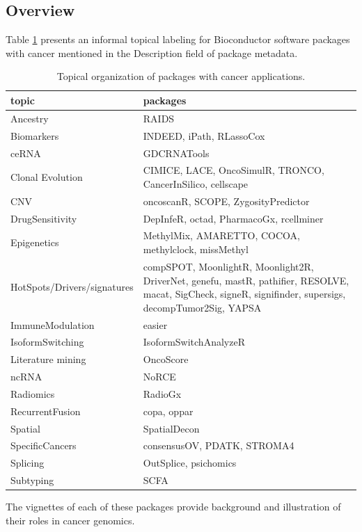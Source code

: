 \hypertarget{overview}{%
\subsection{Overview}\label{overview}}

Table \ref{tab:tab-wflow} presents an informal topical
labeling for Bioconductor software packages with
cancer mentioned in the Description field of package
metadata.

\begin{longtable}[t]{l>{\raggedright\arraybackslash}p{30em}}
\caption{\label{tab:tab-wflow}Topical organization of packages with cancer applications.}\\
\toprule
topic & packages\\
\midrule
Ancestry & RAIDS\\
Biomarkers & INDEED, iPath, RLassoCox\\
ceRNA & GDCRNATools\\
Clonal Evolution & CIMICE, LACE, OncoSimulR, TRONCO, CancerInSilico, cellscape\\
CNV & oncoscanR, SCOPE, ZygosityPredictor\\
\addlinespace
DrugSensitivity & DepInfeR, octad, PharmacoGx, rcellminer\\
Epigenetics & MethylMix, AMARETTO, COCOA, methylclock, missMethyl\\
HotSpots/Drivers/signatures & compSPOT, MoonlightR, Moonlight2R, DriverNet, genefu, mastR, pathifier, RESOLVE, macat, SigCheck, signeR, signifinder, supersigs, decompTumor2Sig, YAPSA\\
ImmuneModulation & easier\\
IsoformSwitching & IsoformSwitchAnalyzeR\\
\addlinespace
Literature mining & OncoScore\\
ncRNA & NoRCE\\
Radiomics & RadioGx\\
RecurrentFusion & copa, oppar\\
Spatial & SpatialDecon\\
\addlinespace
SpecificCancers & consensusOV, PDATK, STROMA4\\
Splicing & OutSplice, psichomics\\
Subtyping & SCFA\\
\bottomrule
\end{longtable}

The vignettes of each of these packages provide background and
illustration of their roles in cancer genomics.

